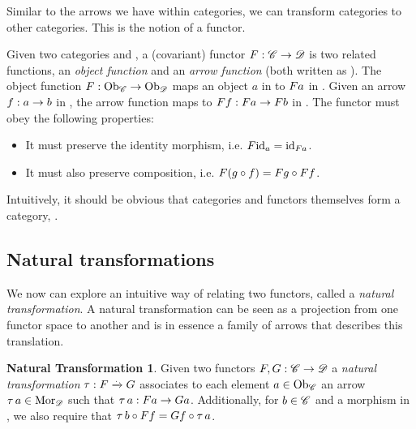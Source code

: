 Similar to the arrows we have within categories, we can transform categories to other categories. This is the notion of a functor.
\begin{covfunctordef}
  Given two categories  and , a (covariant) functor $\mathnormal{F}:
  \mathscr{C} \to \mathscr{D}$ is two related functions, an \emph{object function} and
  an \emph{arrow function} (both written as ). The object function
  $\mathnormal{F}: \mathrm{Ob}_{\mathscr{C}} \to \mathrm{Ob}_{\mathscr{D}}$ maps an object $a$ in  to
  $\mathnormal{F} \mathnormal{a}$ in . Given an arrow $\mathnormal{f}: \mathnormal{a} \to
  \mathnormal{b}$ in , the arrow function maps  to
  $\mathnormal{F} \mathnormal{f}: \mathnormal{F} \mathnormal{a} \to \mathnormal{F} \mathnormal{b}$ in . The functor must obey the following properties:
  \begin{itemize}
    \item It must preserve the identity morphism, i.e. $\mathnormal{F} \mathnormal{\mathrm{id}_{\mathnormal{a}}} = \mathrm{id}_{\mathnormal{\mathnormal{F} \mathnormal{a}}}$.
    \item It must also preserve composition, i.e.
        $\mathnormal{F} \mathnormal{\left(\mathnormal{g} \circ \mathnormal{f}\right)} = \mathnormal{F} \mathnormal{\mathnormal{g}} \circ \mathnormal{F} \mathnormal{\mathnormal{f}}$.
  \end{itemize}
\end{covfunctordef}

Intuitively, it should be obvious that categories and functors themselves form a category, .\\

\subsection{Natural transformations}
\theoremstyle{definition}\newtheorem*{nattransdef}{Natural Transformation}
We now can explore an intuitive way of relating two functors, called a
\emph{natural transformation}. A natural transformation can be seen as a
projection from one functor space to another and is in essence a family of arrows that describes this translation.
\begin{nattransdef}
Given two functors $\mathnormal{F}, \mathnormal{G} : \mathscr{C} \to \mathscr{D}$ a
\emph{natural transformation} $\tau: \mathnormal{F} \xrightarrow{.} \mathnormal{G}$ associates to each element $\mathnormal{a} \in \mathrm{Ob}_{\mathscr{C}}$ an arrow $\tau\,a \in \mathrm{Mor}_{\mathscr{D}}$ such that $\tau\,a: \mathnormal{F} \mathnormal{a} \to \mathnormal{G} \mathnormal{a}$. Additionally, for $\mathnormal{b} \in \mathscr{C}$ and  a morphism in , we also require that $\tau\,b \circ \mathnormal{F} \mathnormal{f} = \mathnormal{G} \mathnormal{f} \circ \tau\,a$.

\end{nattransdef}

